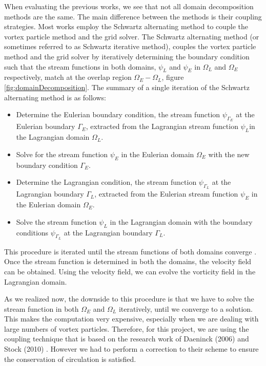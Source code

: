 When evaluating the previous works, we see that not all domain decomposition methods are the same. The main difference between the methods is their coupling strategies. Most works employ the Schwartz alternating method to couple the vortex particle method and the grid solver. The Schwartz alternating method (or sometimes referred to as Schwartz iterative method), couples the vortex particle method and the grid solver by iteratively determining the boundary condition such that the stream functions in both domains, $\psi_L$ and $\psi_E$ in $\Omega_L$ and $\Omega_E$ respectively, match at the overlap region $\Omega_E-\Omega_L$, figure \ref{fig:domainDecomposition}. The summary of a single iteration of the Schwartz alternating method is as follows:
	\begin{itemize}
	\item Determine the Eulerian boundary condition, the stream function $\psi_{\Gamma_E}$ at the Eulerian boundary $\Gamma_E$, extracted from the Lagrangian stream function $\psi_L$in the Lagrangian domain $\Omega_L$.
	\item Solve for the stream function $\psi_E$ in the Eulerian domain $\Omega_E$ with the new boundary condition $\Gamma_E$.
	\item Determine the Lagrangian condition, the stream function $\psi_{\Gamma_L}$ at the Lagrangian boundary $\Gamma_L$, extracted from the Eulerian stream function $\psi_E$ in the Eulerian domain $\Omega_E$.
	\item Solve the stream function $\psi_L$ in the Lagrangian domain with the boundary conditions $\psi_{\Gamma_L}$ at the Lagrangian boundary $\Gamma_L$.
	\end{itemize}
	
This procedure is iterated until the stream functions of both domains converge \cite{Ould-Salihi2001a}. Once the stream function is determined in both the domains, the velocity field can be obtained. Using the velocity field, we can evolve the vorticity field in the Lagrangian domain.

As we realized now, the downside to this procedure is that we have to solve the stream function in both $\Omega_E$ and $\Omega_L$ iteratively, until we converge to a solution. This makes the computation very expensive, especially when we are dealing with large numbers of vortex particles. Therefore, for this project, we are using the coupling technique that is based on the research work of Daeninck (2006) \cite{Daeninck2006} and Stock (2010) \cite{Stock2010a}. However we had to perform a correction to their scheme to ensure the conservation of circulation is satisfied.

